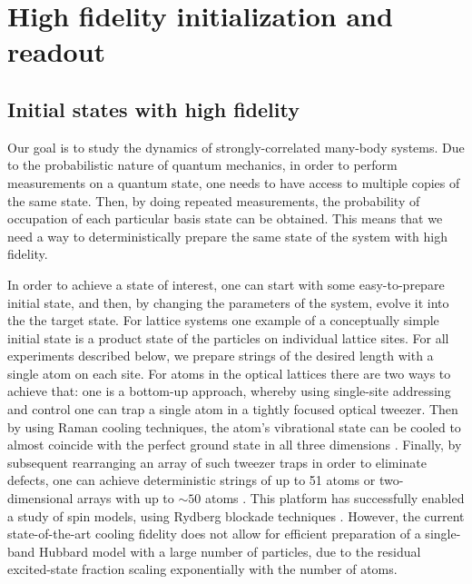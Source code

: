 \chapter{High fidelity initialization and readout}

\section{Initial states with high fidelity}

Our goal is to study the dynamics of strongly-correlated many-body systems. Due to the probabilistic nature of quantum mechanics, in order to perform measurements on a quantum state, one needs to have access to multiple copies of the same state. Then, by doing repeated measurements, the probability of occupation of each particular basis state can be obtained. This means that we need a way to deterministically prepare the same state of the system with high fidelity. 

In order to achieve a state of interest, one can start with some easy-to-prepare initial state, and then, by changing the parameters of the system, evolve it into the the target state. For lattice systems one example of a conceptually simple initial state is a product state of the particles on individual lattice sites. For all experiments described below, we prepare strings of the desired length with a single atom on each site. For atoms in the optical lattices there are two ways to achieve that: one is a bottom-up approach, whereby using single-site addressing and control one can trap a single atom in a tightly focused optical tweezer. Then by using Raman cooling techniques, the atom's vibrational state can be cooled to almost coincide with the perfect ground state in all three dimensions \cite{Kaufman2012, Thompson2013}. Finally, by subsequent rearranging an array of such tweezer traps in order to eliminate defects, one can achieve deterministic strings of up to 51 atoms \cite{Bernien2017} or two-dimensional arrays with up to $\sim50$ atoms \cite{Barredo2016}. This platform has successfully enabled a study of spin models, using Rydberg blockade techniques \cite{Bernien2017}. However, the current state-of-the-art cooling fidelity does not allow for efficient preparation of a single-band Hubbard model with a large number of particles, due to the residual excited-state fraction scaling exponentially with the number of atoms.

